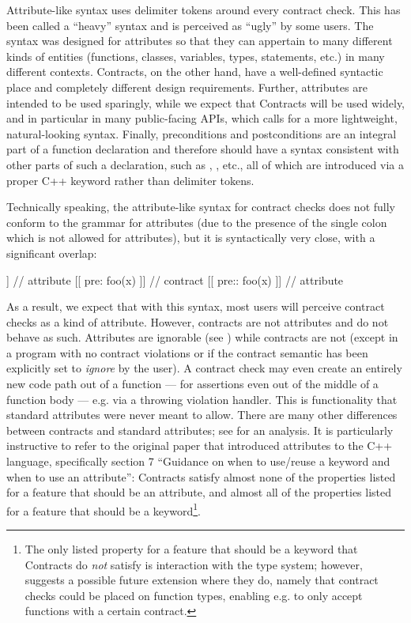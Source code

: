 Attribute-like syntax uses \tcode{[[...]]} delimiter tokens around every contract check. This has been called a ``heavy'' syntax and is  perceived as ``ugly'' by some users. The \tcode{[[...]]} syntax was designed for attributes so that they can appertain to many different kinds of entities (functions, classes, variables, types, statements, etc.) in many different contexts. Contracts, on the other hand, have a well-defined syntactic place and completely different design requirements. Further, attributes are intended to be used sparingly, while we expect that Contracts will be used widely, and in particular in many public-facing APIs, which calls for a more lightweight, natural-looking syntax. Finally, preconditions and postconditions are an integral part of a function declaration and therefore should have a syntax consistent with other parts of such a declaration, such as , , etc., all of which are introduced via a proper C++ keyword rather than delimiter tokens.

Technically speaking, the attribute-like syntax for contract checks does not fully conform to the grammar for attributes (due to the presence of the single colon which is not allowed for attributes), but it is syntactically very close, with a significant overlap:

\begin{codeblock}
[[ pre(foo(x)) ]]  // attribute
[[ pre: foo(x) ]]  // contract
[[ pre:: foo(x) ]] // attribute
\end{codeblock}

As a result, we expect that with this syntax, most users will perceive contract checks as a kind of attribute. However, contracts are not attributes and do not behave as such. Attributes are ignorable (see \cite{P2552R3}) while contracts are not (except in a program with no contract violations or if the contract semantic has been explicitly set to \emph{ignore} by the user). A contract check may even create an entirely new code path out of a function --- for assertions even out of the middle of a function body --- e.g. via a throwing violation handler. This is functionality that standard attributes were never meant to allow. There are many other differences between contracts and standard attributes; see \cite{P2487R1} for an analysis. It is particularly instructive to refer to the original paper \cite{N2761} that introduced attributes to the C++ language, specifically section 7 ``Guidance on when to use/reuse a keyword and when to use an attribute'': Contracts satisfy almost none of the properties listed for a feature that should be an attribute, and almost all of the properties listed for a feature that should be a keyword\footnote{The only listed property for a feature that should be a keyword that Contracts do \emph{not} satisfy is interaction with the type system; however, \cite{P2935R3} suggests a possible future extension where they do, namely that contract checks could be placed on function types, enabling e.g.  to only accept functions with a certain contract.}.

